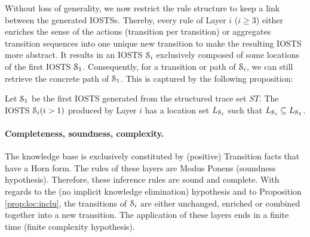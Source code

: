 Without loss of generality, we now restrict the rule structure to
keep a link between the generated IOSTSs. Thereby, every rule of
Layer $i$ ($i \geq 3$) either enriches the sense of the actions
(transition per transition) or aggregates transition sequences
into one unique new transition to make the resulting IOSTS more
abstract. It results in an IOSTS $\EuScript{S}_i$ exclusively
composed of some locations of the first IOSTS $\EuScript{S}_1$.
Consequently, for a transition or path of $\EuScript{S}_i$, we
can still retrieve the concrete path of $\EuScript{S}_1$. This is
captured by the following proposition:

\begin{proposition}
\label{prop:loc:inclu}
Let $\EuScript{S}_1$ be the first IOSTS generated from the
structured trace set $ST$. The IOSTS $\EuScript{S}_i (i>1)$
produced by Layer $i$ has a location set $L_{\EuScript{S}_i}$
such that $L_{\EuScript{S}_i} \subseteq L_{\EuScript{S}_1}$.
\end{proposition}

\paragraph{Completeness, soundness, complexity.}

The knowledge base is exclusively constituted by (positive)
Transition facts that have a Horn form. The rules of these layers
are Modus Ponens (soundness hypothesis). Therefore, these
inference rules are sound and complete. With regards to the (no
implicit knowledge elimination) hypothesis and to Proposition
\ref{prop:loc:inclu}, the transitions of $\EuScript{S}_i$ are
either unchanged, enriched or combined together into a new
transition. The application of these layers ends in a finite time
(finite complexity hypothesis).

